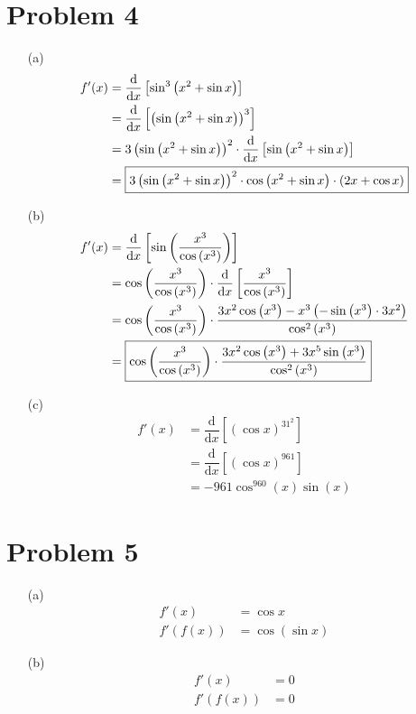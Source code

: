 \documentclass{article}
\newcommand*{\paren}[1]{\ensuremath\left(#1\right)}
\newcommand*{\problem}[1]{\section*{Problem #1}}
\newcommand*{\Deriv}[2][x]{\ensuremath{\dfrac{\mathrm{d}}{\mathrm{d}#1}\left[#2\right]}}
\begin{document}
\problem{4}
\begin{itemize}
	\item[(a)]
	\begin{align*}
		f'(x)&=\Deriv{\sin^3\paren{x^2+\sin x}} \\
		&=\Deriv{\paren{\sin\paren{x^2+\sin x}}^3} \\
		&=3\paren{\sin\paren{x^2+\sin x}}^2\cdot\Deriv{\sin\paren{x^2+\sin x}} \\
		&=\boxed{3\paren{\sin\paren{x^2+\sin x}}^2\cdot\cos\paren{x^2+\sin x}\cdot\paren{2x+\cos x}} \\
	\end{align*}

	\item[(b)]
	\begin{align*}
		f'(x)&=\Deriv{\sin\paren{\frac{x^3}{\cos\paren{x^3}}}} \\
		&=\cos\paren{\frac{x^3}{\cos\paren{x^3}}}\cdot\Deriv{\frac{x^3}{\cos\paren{x^3}}} \\
		&=\cos\paren{\frac{x^3}{\cos\paren{x^3}}}\cdot\frac{3x^2\cos\paren{x^3}-x^3\paren{-\sin\paren{x^3}\cdot3x^2}}{\cos^2\paren{x^3}} \\
		&=\boxed{\cos\paren{\frac{x^3}{\cos\paren{x^3}}}\cdot\frac{3x^2\cos\paren{x^3}+3x^5\sin\paren{x^3}}{\cos^2\paren{x^3}}} \\
	\end{align*}

	\item[(c)]
	\begin{align*}
		f'(x)&=\Deriv{(\cos x)^{31^2}} \\
		&=\Deriv{(\cos x)^{961}} \\
		&=\boxed{-961\cos^{960}(x)\sin(x)}
	\end{align*}
\end{itemize}

\problem{5}
\begin{multicols}{2}
	\allowdisplaybreaks[0]
	\begin{itemize}
		\item[(a)]
		\begin{align*}
			f'(x)&=\cos x \\
			f'(f(x))&=\boxed{\cos(\sin x)}
		\end{align*}
		
		\item[(b)]
		\begin{align*}
			f'(x)&=0 \\
			f'(f(x))&=\boxed{0}
		\end{align*}
	\end{itemize}
	\allowdisplaybreaks
\end{multicols}
\end{document}
